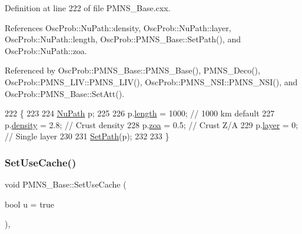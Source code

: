 Definition at line 222 of file P\+M\+N\+S\+\_\+\+Base.\+cxx.



References Osc\+Prob\+::\+Nu\+Path\+::density, Osc\+Prob\+::\+Nu\+Path\+::layer, Osc\+Prob\+::\+Nu\+Path\+::length, Osc\+Prob\+::\+P\+M\+N\+S\+\_\+\+Base\+::\+Set\+Path(), and Osc\+Prob\+::\+Nu\+Path\+::zoa.



Referenced by Osc\+Prob\+::\+P\+M\+N\+S\+\_\+\+Base\+::\+P\+M\+N\+S\+\_\+\+Base(), P\+M\+N\+S\+\_\+\+Deco(), Osc\+Prob\+::\+P\+M\+N\+S\+\_\+\+L\+I\+V\+::\+P\+M\+N\+S\+\_\+\+L\+I\+V(), Osc\+Prob\+::\+P\+M\+N\+S\+\_\+\+N\+S\+I\+::\+P\+M\+N\+S\+\_\+\+N\+S\+I(), and Osc\+Prob\+::\+P\+M\+N\+S\+\_\+\+Base\+::\+Set\+Att().


\begin{DoxyCode}
222                           \{
223 
224   \hyperlink{structOscProb_1_1NuPath}{NuPath} p;
225 
226   p.\hyperlink{structOscProb_1_1NuPath_af22660894b6e25cf835500381b155557}{length}  = 1000; \textcolor{comment}{// 1000 km default}
227   p.\hyperlink{structOscProb_1_1NuPath_a54ddd451db69bc54434de3cf18a117ca}{density} = 2.8;  \textcolor{comment}{// Crust density}
228   p.\hyperlink{structOscProb_1_1NuPath_af3213f3691ba83c6bc05f4a3490f6b31}{zoa}     = 0.5;  \textcolor{comment}{// Crust Z/A}
229   p.\hyperlink{structOscProb_1_1NuPath_a442b160899e554ad1d800989510d5309}{layer}   = 0;    \textcolor{comment}{// Single layer}
230 
231   \hyperlink{classOscProb_1_1PMNS__Base_ac3b644fd0a56347d304ceca4ae9d8875}{SetPath}(p);
232 
233 \}
\end{DoxyCode}
\mbox{\label{classOscProb_1_1PMNS__Base_aa94c1e1fff0ba731c75f7e633b023a9f}} 
\subsubsection{\texorpdfstring{Set\+Use\+Cache()}{SetUseCache()}}
{\footnotesize\ttfamily void P\+M\+N\+S\+\_\+\+Base\+::\+Set\+Use\+Cache (\begin{DoxyParamCaption}\item[{bool}]{u = {\ttfamily true} }\end{DoxyParamCaption})\hspace{0.3cm}{\ttfamily [virtual]}, {\ttfamily [inherited]}}

